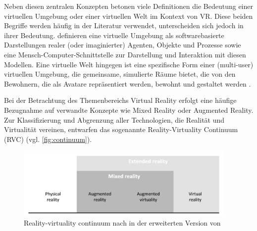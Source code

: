 Neben diesen zentralen Konzepten betonen viele Definitionen die Bedeutung einer virtuellen Umgebung oder einer virtuellen Welt im Kontext von VR. Diese beiden Begriffe werden häufig in der Literatur verwendet, unterscheiden sich jedoch in ihrer Bedeutung. \citet{10.5555/216164.216189} definieren eine virtuelle Umgebung als softwarebasierte Darstellungen realer (oder imaginierter) Agenten, Objekte und Prozesse sowie eine Mensch-Computer-Schnittstelle zur Darstellung und Interaktion mit diesen Modellen. Eine virtuelle Welt hingegen ist eine spezifische Form einer (multi-user) virtuellen Umgebung, die gemeinsame, simulierte Räume bietet, die von den Bewohnern, die als Avatare repräsentiert werden, bewohnt und gestaltet werden \citep{girvan_what_2018}.

Bei der Betrachtung des Themenbereichs Virtual Reality erfolgt eine häufige Bezugnahme auf verwandte Konzepte wie Mixed Reality oder Augmented Reality. Zur Klassifizierung und Abgrenzung aller Technologien, die Realität und Virtualität vereinen, entwarfen \citet{10.1117/12.197321} das sogenannte Reality-Virtuality Continuum (RVC) (vgl. \autoref{fig:continuum}). 

\begin{figure}[tbh]
    \centering
    \includegraphics[width=0.95\textwidth]{images/Mixed-Reality-Cont-NEW.png}
    \caption{Reality-virtuality continuum nach \cite{10.1117/12.197321} in der erweiterten Version von \cite{wohlgenannt_virtual_2020}}
    \label{fig:continuum}
\end{figure}

